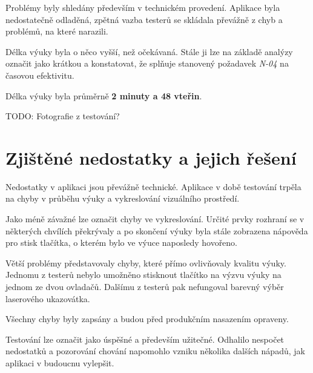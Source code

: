 Problémy byly shledány především v technickém provedení. Aplikace 
byla nedostatečně odladěná, zpětná vazba testerů se skládala 
převážně z chyb a problémů, na které narazili.

Délka výuky byla o něco vyšší, než očekávaná. Stále ji lze na základě analýzy označit
jako krátkou a konstatovat, že splňuje stanovený požadavek \emph{N-04} na časovou efektivitu.

Délka výuky byla průměrně \textbf{2 minuty a 48 vteřin}.

TODO: Fotografie z testování?

\section{Zjištěné nedostatky a jejich řešení}\label{zjiux161tux11bnuxe9-nedostatky}

Nedostatky v aplikaci jsou převážně technické. Aplikace v době testování trpěla na
chyby v průběhu výuky a vykreslování vizuálního prostředí.

Jako méně závažné lze označit chyby ve vykreslování. Určité prvky rozhraní se v některých
chvílích překrývaly a po skončení výuky byla stále zobrazena nápověda pro stisk
tlačítka, o kterém bylo ve výuce naposledy hovořeno.

Větší problémy představovaly chyby, které přímo ovlivňovaly kvalitu 
výuky. Jednomu z testerů nebylo umožněno stisknout tlačítko na výzvu 
výuky na jednom ze dvou ovladačů. Dalšímu z testerů pak nefungoval 
barevný výběr laserového ukazovátka.

Všechny chyby byly zapsány a budou před produkčním nasazením opraveny.

Testování lze označit jako úspěšné a především užitečné. Odhalilo 
nespočet nedostatků a pozorování chování napomohlo vzniku
několika dalších nápadů, jak aplikaci v budoucnu vylepšit.